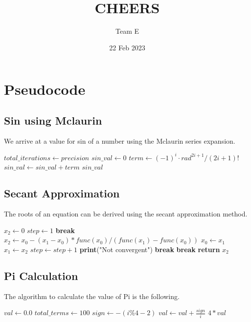 \documentclass{report}
\begin{document}
\title{CHEERS}
\author{Team E}
\date{22 Feb 2023}
\maketitle

\chapter*{Pseudocode}
\section{Sin using Mclaurin}
We arrive at a value for sin of a number using the Mclaurin series expansion.
\break
\begin{algorithmic}[1]
        \State $total\_iterations \gets precision$
        \State $sin\_val \gets 0$
            \State $term \gets (-1)^i \cdot rad^{2i + 1} / (2i + 1)!$
            \State $sin\_val \gets sin\_val + term$
        \EndFor
        \State \Return $sin\_val$
    \EndFunction
\end{algorithmic}

\section{Secant Approximation}
The roots of an equation can be derived using the secant approximation method.
\break
\begin{algorithmic}[1]
    \State $x_2 \gets 0$
    \State $step \gets 1$
            \State \textbf{break}
        \EndIf
        \State $x_2 \gets x_0 - (x_1 - x_0) * func(x_0) / (func(x_1) - func(x_0))$
        \State $x_0 \gets x_1$
        \State $x_1 \gets x_2$
        \State $step \gets step + 1$
            \State \textbf{print}("Not convergent")
            \State \textbf{break}
        \EndIf
            \State \textbf{break}
        \EndIf
    \EndWhile
    \State \textbf{return} $x_2$
\EndFunction
\end{algorithmic}

\section{Pi Calculation}
The algorithm to calculate the value of Pi is the following.
\break
\begin{algorithmic}[1]
        \State $val \gets 0.0$
        \State $total\_terms \gets 100$
            \State $sign \gets -(i\%4-2)$
            \State $val \gets val + \frac{sign}{i}$
        \EndFor
        \State \Return $4 * val$
    \EndFunction
\end{algorithmic}
\end{document}
